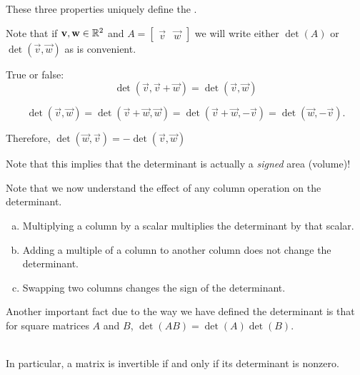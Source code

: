 \begin{applicationActivities}{1}{25}
\begin{definition}
These three properties uniquely define the .

\end{definition}

\begin{observation}
Note that if $\mathbf{v},\mathbf{w} \in \mathbb{R}^2$ and $A=\begin{bmatrix} \vec{v} & \vec{w}\end{bmatrix}$ we will write either $\det(A)$ or $\det(\vec{v},\vec{w})$ as is convenient.
\end{observation}

\begin{activity}{5}
True or false: $$\det(\vec{v},\vec{v}+\vec{w}) = \det(\vec{v},\vec{w})$$

\begin{center}
\end{center}
\end{activity}

\begin{observation}
$$\det(\vec{v},\vec{w}) =  \det(\vec{v}+\vec{w}, \vec{w}) = \det(\vec{v}+\vec{w}, -\vec{v}) = \det(\vec{w}, -\vec{v}).$$ 

Therefore, $\det(\vec{w},\vec{v}) = -\det(\vec{v},\vec{w})$ 


Note that this implies that the determinant is actually a \textit{signed} area (volume)!
\end{observation}



\begin{observation}
  Note that we now understand the effect of any column operation on the determinant.
  \begin{enumerate}[(a)]
  \item Multiplying a column by a scalar multiplies the determinant by that scalar.
  \item Adding a multiple of a column to another column does not change the determinant.
  \item Swapping two columns changes the sign of the determinant.
  \end{enumerate}
\end{observation}

\begin{observation}
Another important fact due to the way we have defined the determinant is that for square matrices $A$ and $B$, $\det(AB)=\det(A)\det(B)$.

\ \\

In particular, a matrix is invertible if and only if its determinant is nonzero.
\end{observation}


\end{applicationActivities}
